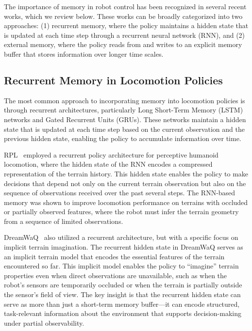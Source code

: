 The importance of memory in robot control has been recognized in several recent works, which we review below. These works can be broadly categorized into two approaches: (1) recurrent memory, where the policy maintains a hidden state that is updated at each time step through a recurrent neural network (RNN), and (2) external memory, where the policy reads from and writes to an explicit memory buffer that stores information over longer time scales.

\subsection{Recurrent Memory in Locomotion Policies}

The most common approach to incorporating memory into locomotion policies is through recurrent architectures, particularly Long Short-Term Memory (LSTM) networks and Gated Recurrent Units (GRUs). These networks maintain a hidden state that is updated at each time step based on the current observation and the previous hidden state, enabling the policy to accumulate information over time.

RPL~\cite{zhang2024rpl} employed a recurrent policy architecture for perceptive humanoid locomotion, where the hidden state of the RNN encodes a compressed representation of the terrain history. This hidden state enables the policy to make decisions that depend not only on the current terrain observation but also on the sequence of observations received over the past several steps. The RNN-based memory was shown to improve locomotion performance on terrains with occluded or partially observed features, where the robot must infer the terrain geometry from a sequence of limited observations.

DreamWaQ~\cite{nahraendra2024dreamwaq} also utilized a recurrent architecture, but with a specific focus on implicit terrain imagination. The recurrent hidden state in DreamWaQ serves as an implicit terrain model that encodes the essential features of the terrain encountered so far. This implicit model enables the policy to ``imagine'' terrain properties even when direct observations are unavailable, such as when the robot's sensors are temporarily occluded or when the terrain is partially outside the sensor's field of view. The key insight is that the recurrent hidden state can serve as more than just a short-term memory buffer---it can encode structured, task-relevant information about the environment that supports decision-making under partial observability.


